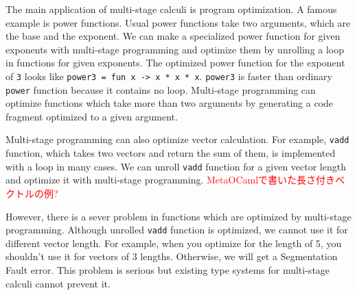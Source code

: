 \documentclass[runningheads]{llncs}
\newcommand{\red}[1]{\textcolor{red}{#1 }}
\begin{document}

The main application of multi-stage calculi is program optimization.
A famous example is power functions.
Usual power functions take two arguments, which are the base and the exponent.
We can make a specialized power function for given exponents with multi-stage programming and 
optimize them by unrolling a loop in functions for given exponents.
The optimized power function for the exponent of \verb|3| looks like \verb|power3 = fun x -> x * x * x|.
\verb|power3| is faster than ordinary \verb|power| function because it contains no loop.
Multi-stage programming can optimize functions which take more than two arguments 
by generating a code fragment optimized to a given argument.


Multi-stage programming can also optimize vector calculation.
For example, \verb|vadd| function, which takes two vectors and return the sum of them,
is implemented with a loop in many cases.
We can unroll \verb|vadd| function for a given vector length and optimize it with multi-stage programming.
\red{MetaOCamlで書いた長さ付きベクトルの例?}


However, there is a sever problem in functions which are optimized by multi-stage programming.
Although unrolled \verb|vadd| function is optimized, we cannot use it for different vector length.
For example, when you optimize for the length of 5, you shouldn't use it for vectors of 3 lengths.
Otherwise, we will get a Segmentation Fault error.
This problem is serious but existing type systems for multi-stage calculi cannot prevent it.

\end{document}

